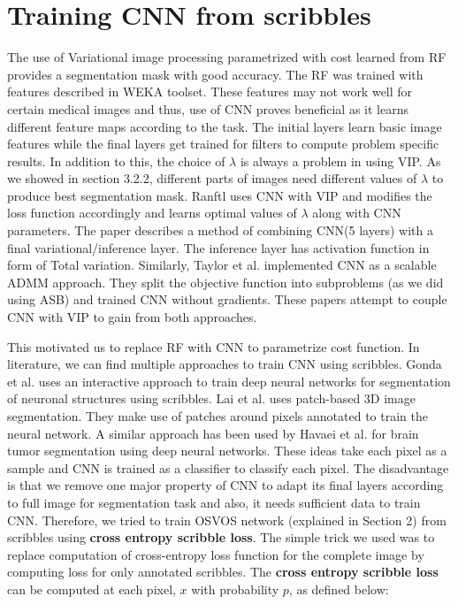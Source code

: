 \section{Training CNN from scribbles}
The use of Variational image processing parametrized with cost learned from RF provides a segmentation mask with good accuracy. The RF was trained with features described in WEKA toolset. These features may not work well for certain medical images and thus, use of CNN proves beneficial as it learns different feature maps according to the task. The initial layers learn basic image features while the final layers get trained for filters to compute problem specific results. In addition to this, the choice of $\lambda$ is always a problem in using VIP. As we showed in section 3.2.2, different parts of images need different values of $\lambda$ to produce best segmentation mask. Ranftl \cite{ranftl:2014} uses CNN with VIP and modifies the loss function accordingly and learns optimal values of $\lambda$ along with CNN parameters. The paper describes a method of combining CNN(5 layers) with a final variational/inference layer. The inference layer has activation function in form of Total variation. Similarly, Taylor et al. \cite{taylor:2016} implemented CNN as a scalable ADMM approach. They split the objective function into subproblems (as we did using ASB) and trained CNN without gradients. These papers attempt to couple CNN with VIP to gain from both approaches. \par

This motivated us to replace RF with CNN to parametrize cost function. In literature, we can find multiple approaches to train CNN using scribbles. Gonda et al.\cite{Gonda:2016} uses an interactive approach to train deep neural networks for segmentation of neuronal structures using scribbles. Lai et al. \cite{Lai:2015} uses patch-based 3D image segmentation. They make use of patches around pixels annotated to train the neural network. A similar approach has been used by Havaei et al.\cite{Havaei:2015} for brain tumor segmentation using deep neural networks. These ideas take each pixel as a sample and CNN is trained as a classifier to classify each pixel. The disadvantage is that we remove one major property of CNN to adapt its final layers according to full image for segmentation task and also, it needs sufficient data to train CNN. Therefore, we tried to train OSVOS network (explained in Section 2) from scribbles using \textbf{cross entropy scribble loss}. The simple trick we used was to replace computation of cross-entropy loss function for the complete image by computing loss for only annotated scribbles. The \textbf{cross entropy scribble loss} can be computed at each pixel, $x$ with probability $p$, as defined below:

